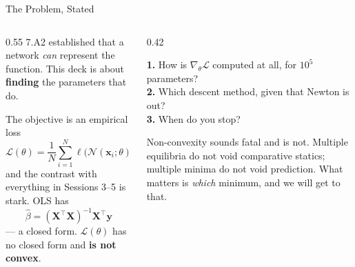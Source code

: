 \begin{frame}{The Problem, Stated}
\begin{columns}[T]
\begin{column}{0.55\textwidth}
\small
7.A2 established that a network \emph{can} represent the function. This deck is about \textbf{finding} the parameters that do.
\medskip

The objective is an empirical loss
\[
  \mathcal{L}(\theta)=\frac{1}{N}\sum_{i=1}^{N}\ell\bigl(\mathcal{N}(\mathbf{x}_i;\theta),y_i\bigr),
\]
and the contrast with everything in Sessions 3--5 is stark. OLS has
\[
  \hat\beta=(\mathbf{X}^{\top}\mathbf{X})^{-1}\mathbf{X}^{\top}\mathbf{y}
\]
--- a closed form. $\mathcal{L}(\theta)$ has no closed form and \textbf{is not convex}.
\end{column}
\begin{column}{0.42\textwidth}
\begin{conceptbox}[title=\textbf{Three questions, in order}]\small
\textbf{1.} How is $\nabla_\theta\mathcal{L}$ computed at all, for $10^{5}$ parameters?\\[1mm]
\textbf{2.} Which descent method, given that Newton is out?\\[1mm]
\textbf{3.} When do you stop?
\end{conceptbox}
\medskip
\begin{cautionbox}\footnotesize
Non-convexity sounds fatal and is not. Multiple equilibria do not void comparative statics; multiple minima do not void prediction. What matters is \emph{which} minimum, and we will get to that.
\end{cautionbox}
\end{column}
\end{columns}
\vspace{1mm}
\end{frame}

